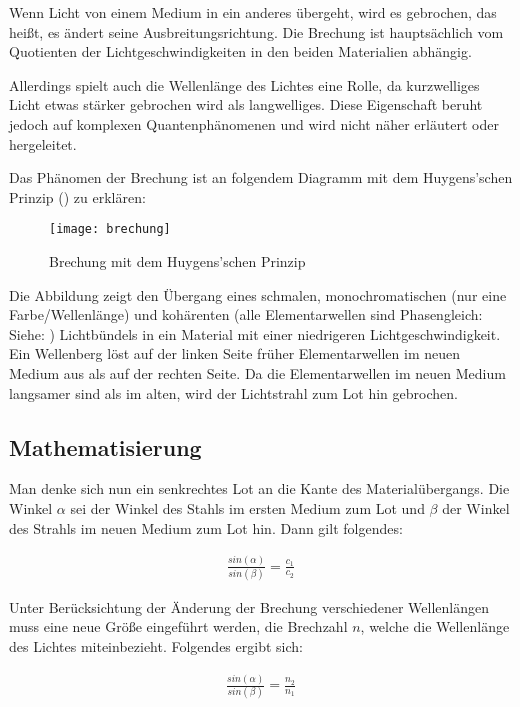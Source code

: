 Wenn Licht von einem Medium in ein anderes übergeht, wird es gebrochen, das heißt, es ändert seine Ausbreitungsrichtung. Die Brechung ist hauptsächlich vom Quotienten der Lichtgeschwindigkeiten in den beiden Materialien abhängig.

Allerdings spielt auch die Wellenlänge des Lichtes eine Rolle, da kurzwelliges Licht etwas stärker gebrochen wird als langwelliges. Diese Eigenschaft beruht jedoch auf komplexen Quantenphänomenen und wird nicht näher erläutert oder hergeleitet.

Das Phänomen der Brechung ist an folgendem Diagramm mit dem Huygens'schen Prinzip () zu erklären: 

\begin{figure}[!h]
	\center
	\texttt{[image: brechung]}
	\caption{Brechung mit dem Huygens'schen Prinzip}
	\label{fig:brechung}
\end{figure}

Die Abbildung zeigt den Übergang eines schmalen, monochromatischen (nur eine Farbe/Wellenlänge) und kohärenten (alle Elementarwellen sind Phasengleich: Siehe: ) Lichtbündels in ein Material mit einer niedrigeren Lichtgeschwindigkeit. Ein Wellenberg löst auf der linken Seite früher Elementarwellen im neuen Medium aus als auf der rechten Seite. Da die Elementarwellen im neuen Medium langsamer sind als im alten, wird der Lichtstrahl zum Lot hin gebrochen.

\subsection{Mathematisierung}

Man denke sich nun ein senkrechtes Lot an die Kante des Materialübergangs. Die Winkel $\alpha$ sei der Winkel des Stahls im ersten Medium zum Lot und $\beta$ der Winkel des Strahls im neuen Medium zum Lot hin. Dann gilt folgendes:
	
	\begin{align}
		\frac{sin{(\alpha)}}{sin{(\beta)}} = \frac{c_1}{c_2}
	\end{align}
	
Unter Berücksichtung der Änderung der Brechung verschiedener Wellenlängen muss eine neue Größe eingeführt werden, die Brechzahl $n$, welche die Wellenlänge des Lichtes miteinbezieht. Folgendes ergibt sich:
	
	\begin{align} \label{eq:brechungsgesetz}
		\frac{sin{(\alpha)}}{sin{(\beta)}} = \frac{n_2}{n_1}
	\end{align}
